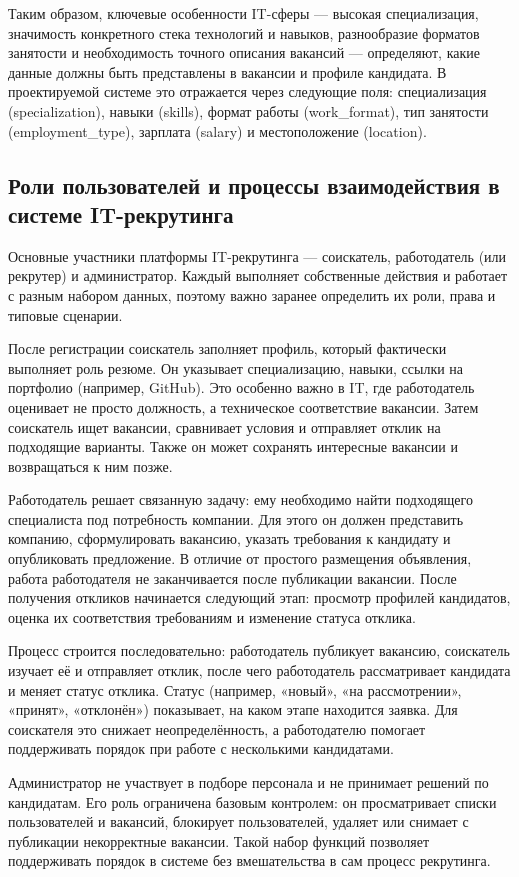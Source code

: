 Таким образом, ключевые особенности IT-сферы — высокая специализация, значимость конкретного стека технологий и навыков, разнообразие форматов занятости и необходимость точного описания вакансий — определяют, какие данные должны быть представлены в вакансии и профиле кандидата. В проектируемой системе это отражается через следующие поля: специализация (specialization), навыки (skills), формат работы (work\_format), тип занятости (employment\_type), зарплата (salary) и местоположение (location).

\subsection{Роли пользователей и процессы взаимодействия в системе IT-рекрутинга}

Основные участники платформы IT-рекрутинга --- соискатель, работодатель (или рекрутер) и администратор. Каждый выполняет собственные действия и работает с разным набором данных, поэтому важно заранее определить их роли, права и типовые сценарии.

После регистрации соискатель заполняет профиль, который фактически выполняет роль резюме. Он указывает специализацию, навыки, ссылки на портфолио (например, GitHub). Это особенно важно в IT, где работодатель оценивает не просто должность, а техническое соответствие вакансии. Затем соискатель ищет вакансии, сравнивает условия и отправляет отклик на подходящие варианты. Также он может сохранять интересные вакансии и возвращаться к ним позже.

Работодатель решает связанную задачу: ему необходимо найти подходящего специалиста под потребность компании. Для этого он должен представить компанию, сформулировать вакансию, указать требования к кандидату и опубликовать предложение. В отличие от простого размещения объявления, работа работодателя не заканчивается после публикации вакансии. После получения откликов начинается следующий этап: просмотр профилей кандидатов, оценка их соответствия требованиям и изменение статуса отклика.

Процесс строится последовательно: работодатель публикует вакансию, соискатель изучает её и отправляет отклик, после чего работодатель рассматривает кандидата и меняет статус отклика. Статус (например, «новый», «на рассмотрении», «принят», «отклонён») показывает, на каком этапе находится заявка. Для соискателя это снижает неопределённость, а работодателю помогает поддерживать порядок при работе с несколькими кандидатами.

Администратор не участвует в подборе персонала и не принимает решений по кандидатам. Его роль ограничена базовым контролем: он просматривает списки пользователей и вакансий, блокирует пользователей, удаляет или снимает с публикации некорректные вакансии. Такой набор функций позволяет поддерживать порядок в системе без вмешательства в сам процесс рекрутинга.

